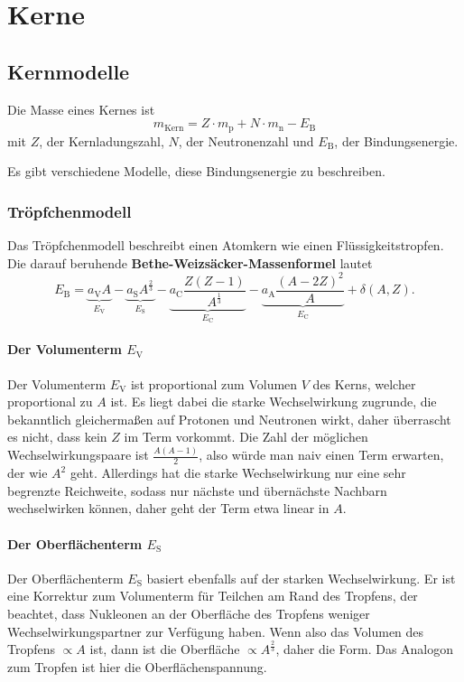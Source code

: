 \chapter{Kerne}

\section{Kernmodelle}
Die Masse eines Kernes ist
\begin{equation*}
	m_\text{Kern} = Z\cdot m_\text{p} + N\cdot m_\text{n} - E_\text{B}
\end{equation*}
mit $Z$, der Kernladungszahl, $N$, der Neutronenzahl und $E_\text{B}$, der Bindungsenergie.

Es gibt verschiedene Modelle, diese Bindungsenergie zu beschreiben.

\subsection{Tröpfchenmodell}
Das Tröpfchenmodell beschreibt einen Atomkern wie einen Flüssigkeitstropfen.
Die darauf beruhende \textbf{Bethe-Weizsäcker-Massenformel} lautet
\begin{equation*}
	E_\text{B} = \underbrace{a_\text{V}A}_{E_\text{V}} - \underbrace{a_\text{S}A^\frac{2}{3}}_{E_\text{S}} - \underbrace{a_\text{C}\frac{Z(Z-1)}{A^\frac{1}{3}}}_{E_\text{C}} - \underbrace{a_\text{A}\frac{(A-2Z)^2}{A}}_{E_\text{C}} + \delta (A,Z).
\end{equation*}

\subsubsection{Der Volumenterm $E_\text{V}$}
Der Volumenterm $E_\text{V}$ ist proportional zum Volumen $V$ des Kerns, welcher proportional zu $A$ ist.
Es liegt dabei die starke Wechselwirkung zugrunde, die bekanntlich gleichermaßen auf Protonen und Neutronen wirkt, daher überrascht es nicht, dass kein $Z$ im Term vorkommt.
Die Zahl der möglichen Wechselwirkungspaare ist $\frac{A(A-1)}{2}$, also würde man naiv einen Term erwarten, der wie $A^2$ geht.
Allerdings hat die starke Wechselwirkung nur eine sehr begrenzte Reichweite, sodass nur nächste und übernächste Nachbarn wechselwirken können, daher geht der Term etwa linear in $A$.

\subsubsection{Der Oberflächenterm $E_\text{S}$}
Der Oberflächenterm $E_\text{S}$ basiert ebenfalls auf der starken Wechselwirkung.
Er ist eine Korrektur zum Volumenterm für Teilchen am Rand des Tropfens, der beachtet, dass Nukleonen an der Oberfläche des Tropfens weniger Wechselwirkungspartner zur Verfügung haben.
Wenn also das Volumen des Tropfens $\propto A$ ist, dann ist die Oberfläche $\propto A^\frac{2}{3}$, daher die Form.
Das Analogon zum Tropfen ist hier die Oberflächenspannung.

